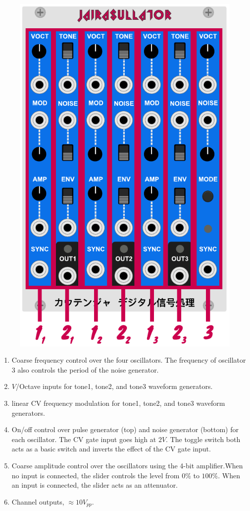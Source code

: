 \documentclass[12pt,letter]{article}
\begin{document}
\begin{figure}[!htp]
\centering
\includegraphics{Interface}
\end{figure}

\begin{enumerate}
  \item Coarse frequency control over the four oscillators. The frequency of oscillator 3 also controls the period of the noise generator.
  \item $V$/Octave inputs for tone1, tone2, and tone3 waveform generators.
  \item linear CV frequency modulation for tone1, tone2, and tone3 waveform generators.
  \item On/off control over pulse generator (top) and noise generator (bottom) for each oscillator. The CV gate input goes high at $2V$. The toggle switch both acts as a basic switch and inverts the effect of the CV gate input.
  \item Coarse amplitude control over the oscillators using the 4-bit amplifier.When no input is connected, the slider controls the level from $0\%$ to $100\%$. When an input is connected, the slider acts as an attenuator.
  \item Channel outputs, ${\approx}10V_{pp}$.
\end{enumerate}


\clearpage
\renewcommand\refname{References \& Acknowledgments}
\nocite{*}


\end{document}
